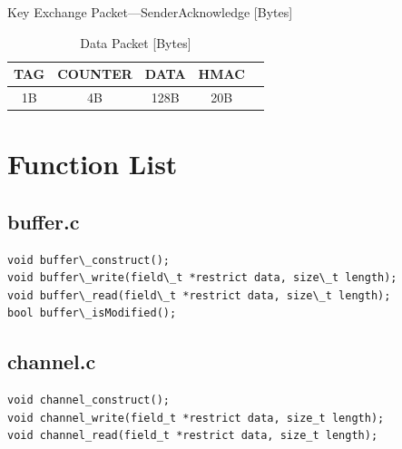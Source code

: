 \documentclass[a4paper]{article}
\begin{document}
\begin{appendices}
\begin{table}[h!]
    \caption{Key Exchange Packet---SenderAcknowledge [Bytes]}
    \label{tab:key_exchange_packet_senderacknowledge}
\end{table}
\begin{table}[h!]
    \begin{center}
        \begin{tabular}{| c | c | c | c | c |}
            \hline
            TAG & COUNTER & DATA & HMAC \\ \hline
            1B & 4B & 128B & 20B \\
            \hline
        \end{tabular}
    \end{center}
    
    \caption{Data Packet [Bytes]}
    \label{tab:data_packet}
\end{table}

\newpage

\section{Function List}

\subsection{buffer.c}

\begin{lstlisting}[numbers=none, xleftmargin=0pt]
void buffer\_construct();
void buffer\_write(field\_t *restrict data, size\_t length);
void buffer\_read(field\_t *restrict data, size\_t length);
bool buffer\_isModified();
\end{lstlisting}

\subsection{channel.c}

\begin{lstlisting}[numbers=none, xleftmargin=0pt]
void channel_construct();
void channel_write(field_t *restrict data, size_t length);
void channel_read(field_t *restrict data, size_t length);
\end{lstlisting}

\end{appendices}
\end{document}
